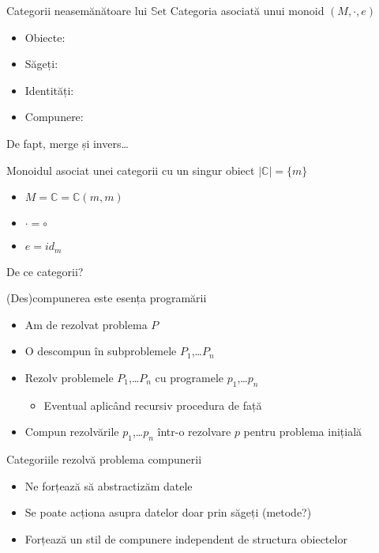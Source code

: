 \documentclass[xcolor=pdftex,romanian,colorlinks]{beamer}
\begin{document}
\begin{frame}{Categorii neasemănătoare lui $\mathrm{\mathbb{S}et}$}
{Categoria asociată unui monoid $(M,\cdot, e)$}
\begin{itemize}
\item Obiecte: 
\item Săgeți: 
\item Identități:  
\item Compunere: 
\end{itemize}

\vfill 
De fapt, merge și invers\dots

\begin{block}{Monoidul asociat unei categorii cu un singur obiect $|\mathbb{C}|=\{m\}$}
\begin{itemize}
\item $M = \mathbb{C} = \mathbb{C}(m,m)$
\item $\cdot = \circ$
\item $e = \mathit{id}_m$
\end{itemize}
\end{block}
\end{frame}

\begin{frame}{De ce categorii?}
\begin{block}{(Des)compunerea este esența programării}
\begin{itemize}
\item Am de rezolvat problema $P$
\item O descompun în subproblemele $P_1$,\dots $P_n$
\item Rezolv problemele $P_1$,\dots $P_n$ cu programele $p_1$,\dots $p_n$
\begin{itemize}
\item Eventual aplicând recursiv procedura de față
\end{itemize}
\item Compun rezolvările  $p_1$,\dots $p_n$ într-o rezolvare $p$ pentru problema inițială
\end{itemize}
\end{block}

\begin{block}{Categoriile rezolvă problema compunerii}
\begin{itemize}
\item Ne forțează să abstractizăm datele
\item Se poate acționa asupra datelor doar prin săgeți (metode?)
\item Forțează un stil de compunere independent de structura obiectelor
\end{itemize}
\end{block}
\end{frame}
\end{document}
